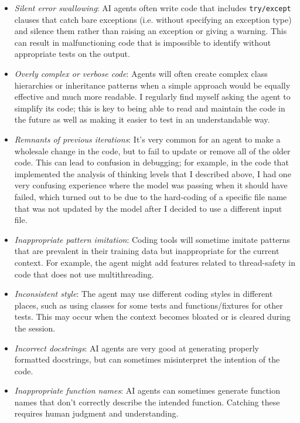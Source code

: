 \begin{itemize}
\item \textit{Silent error swallowing}:  AI agents often write code that includes \texttt{try/except} clauses that catch bare exceptions (i.e. without specifying an exception type) and silence them rather than raising an exception or giving a warning.  This can result in malfunctioning code that is impossible to identify without appropriate tests on the output.
\item \textit{Overly complex or verbose code}: Agents will often create complex class hierarchies or inheritance patterns when a simple approach would be equally effective and much more readable. I regularly find myself asking the agent to simplify its code; this is key to being able to read and maintain the code in the future as well as making it easier to test in an understandable way.
\item \textit{Remnants of previous iterations}: It's very common for an agent to make a wholesale change in the code, but to fail to update or remove all of the older code.  This can lead to confusion in debugging; for example, in the code that implemented the analysis of thinking levels that I described above, I had one very confusing experience where the model was passing when it should have failed, which turned out to be due to the hard-coding of a specific file name that was not updated by the model after I decided to use a different input file.
\item \textit{Inappropriate pattern imitation}: Coding tools will sometime imitate patterns that are prevalent in their training data but inappropriate for the current context.  For example, the agent might add features related to thread-safety in code that does not use multithreading.
\item \textit{Inconsistent style}: The agent may use different coding styles in different places, such as using classes for some tests and functions/fixtures for other tests.  This may occur when the context becomes bloated or is cleared during the session.
\item \textit{Incorrect docstrings}: AI agents are very good at generating properly formatted docstrings, but can sometimes misinterpret the intention of the code.
\item \textit{Inappropriate function names}: AI agents can sometimes generate function names that don't correctly describe the intended function.  Catching these requires human judgment and understanding.
\end{itemize}

